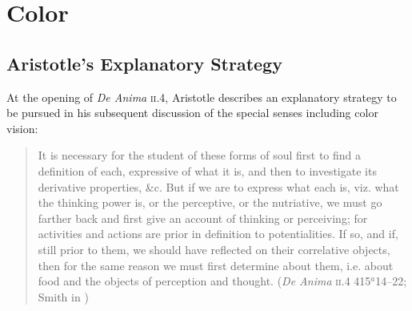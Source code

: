 \chapter{Color} %
\label{cha:color}

\section{Aristotle's Explanatory Strategy} %
\label{sec:aristotle_s_explanatory_strategy}

At the opening of \emph{De Anima} \textsc{ii}.4, Aristotle describes an explanatory strategy to be pursued in his subsequent discussion of the special senses including color vision:
\begin{quote}
	It is necessary for the student of these forms of soul first to find a definition of each, expressive of what it is, and then to investigate its derivative properties, \&c. But if we are to express what each is, viz. what the thinking power is, or the perceptive, or the nutriative, we must go farther back and first give an account of thinking or perceiving; for activities and actions are prior in definition to potentialities. If so, and if, still prior to them, we should have reflected on their correlative objects, then for the same reason we must first determine about them, i.e. about food and the objects of perception and thought. (\emph{De Anima} \textsc{ii}.4 415\( ^{a} \)14--22; Smith in \citealt[26]{Barnes:1984uq})
\end{quote}
